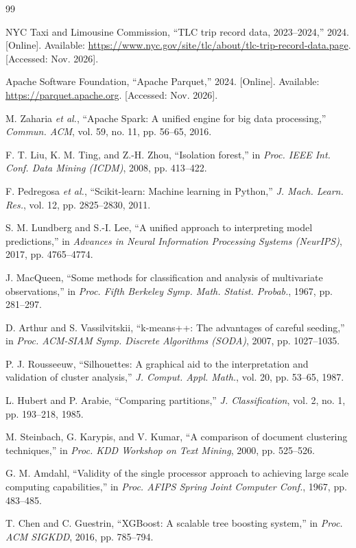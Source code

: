 \documentclass[11pt,a4paper]{article}
\begin{document}
\begin{thebibliography}{99}
\footnotesize
\setlength{\itemsep}{0pt}

NYC Taxi and Limousine Commission, ``TLC trip record data, 2023--2024,'' 2024. [Online]. Available: \url{https://www.nyc.gov/site/tlc/about/tlc-trip-record-data.page}. [Accessed: Nov. 2026].

Apache Software Foundation, ``Apache Parquet,'' 2024. [Online]. Available: \url{https://parquet.apache.org}. [Accessed: Nov. 2026].

M. Zaharia \emph{et al.}, ``Apache Spark: A unified engine for big data processing,'' \emph{Commun. ACM}, vol. 59, no. 11, pp. 56--65, 2016.

F. T. Liu, K. M. Ting, and Z.-H. Zhou, ``Isolation forest,'' in \emph{Proc. IEEE Int. Conf. Data Mining (ICDM)}, 2008, pp. 413--422.

F. Pedregosa \emph{et al.}, ``Scikit-learn: Machine learning in Python,'' \emph{J. Mach. Learn. Res.}, vol. 12, pp. 2825--2830, 2011.

S. M. Lundberg and S.-I. Lee, ``A unified approach to interpreting model predictions,'' in \emph{Advances in Neural Information Processing Systems (NeurIPS)}, 2017, pp. 4765--4774.

J. MacQueen, ``Some methods for classification and analysis of multivariate observations,'' in \emph{Proc. Fifth Berkeley Symp. Math. Statist. Probab.}, 1967, pp. 281--297.

D. Arthur and S. Vassilvitskii, ``k-means++: The advantages of careful seeding,'' in \emph{Proc. ACM-SIAM Symp. Discrete Algorithms (SODA)}, 2007, pp. 1027--1035.

P. J. Rousseeuw, ``Silhouettes: A graphical aid to the interpretation and validation of cluster analysis,'' \emph{J. Comput. Appl. Math.}, vol. 20, pp. 53--65, 1987.

L. Hubert and P. Arabie, ``Comparing partitions,'' \emph{J. Classification}, vol. 2, no. 1, pp. 193--218, 1985.

M. Steinbach, G. Karypis, and V. Kumar, ``A comparison of document clustering techniques,'' in \emph{Proc. KDD Workshop on Text Mining}, 2000, pp. 525--526.

G. M. Amdahl, ``Validity of the single processor approach to achieving large scale computing capabilities,'' in \emph{Proc. AFIPS Spring Joint Computer Conf.}, 1967, pp. 483--485.

T. Chen and C. Guestrin, ``XGBoost: A scalable tree boosting system,'' in \emph{Proc. ACM SIGKDD}, 2016, pp. 785--794.

\end{thebibliography}
\end{document}
